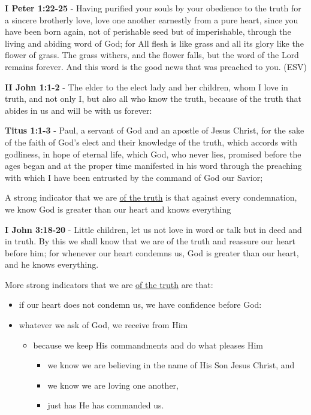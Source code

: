 \documentclass[11pt]{article}
\begin{document}
\textbf{I Peter 1:22-25} - Having purified your souls by your obedience to the truth for a sincere brotherly love, love one another earnestly from a pure heart, since you have been born again, not of perishable seed but of imperishable, through the living and abiding word of God; for All flesh is like grass and all its glory like the flower of grass. The grass withers, and the flower falls, but the word of the Lord remains forever. And this word is the good news that was preached to you. (ESV)

\textbf{II John 1:1-2} - The elder to the elect lady and her children, whom I love in truth, and not only I, but also all who know the truth, because of the truth that abides in us and will be with us forever:

\textbf{Titus 1:1-3} - Paul, a servant of God and an apostle of Jesus Christ, for the sake of the faith of God's elect and their knowledge of the truth, which accords with godliness, in hope of eternal life, which God, who never lies, promised before the ages began and at the proper time manifested in his word through the preaching with which I have been entrusted by the command of God our Savior;

A strong indicator that we are \uline{of the truth} is that against every condemnation, we know God is greater than our heart and knows everything

\textbf{I John 3:18-20} - Little children, let us not love in word or talk but in deed and in truth. By this we shall know that we are of the truth and reassure our heart before him; for whenever our heart condemns us, God is greater than our heart, and he knows everything.

More strong indicators that we are \uline{of the truth} are that:
\begin{itemize}
\item if our heart does not condemn us, we  have confidence before God:
\item whatever we ask of God, we receive from Him
\begin{itemize}
\item because we keep His commandments and do what pleases Him
\begin{itemize}
\item we know we are believing in the name of His Son Jesus Christ, and
\item we know we are loving one another,
\item just has He has commanded us.
\end{itemize}
\end{itemize}
\end{itemize}
\end{document}
